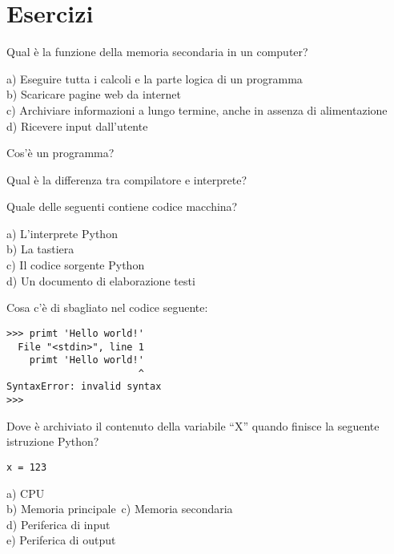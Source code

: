 \section{Esercizi}


\begin{ex}
Qual \`{e} la funzione della memoria secondaria in un computer?

a) Eseguire tutta i calcoli e la parte logica di un programma\\
b) Scaricare pagine web da internet\\
c) Archiviare informazioni a lungo termine, anche in assenza di alimentazione\\
d) Ricevere input dall'utente 
\end{ex}

\begin{ex}
Cos'\`{e} un programma?
\end{ex}

\begin{ex}
Qual \`{e} la differenza tra compilatore e interprete?
\end{ex}

\begin{ex}
Quale delle seguenti contiene codice macchina?

a) L'interprete Python\\
b) La tastiera\\
c) Il codice sorgente Python\\
d) Un documento di elaborazione testi
\end{ex}

\begin{ex}
Cosa c'\`{e} di sbagliato nel codice seguente:

\beforeverb
\begin{verbatim}
>>> primt 'Hello world!'
  File "<stdin>", line 1
    primt 'Hello world!'
                       ^
SyntaxError: invalid syntax
>>> 
\end{verbatim}
\afterverb

\end{ex}

\begin{ex}
Dove \`{e} archiviato il contenuto della variabile {``}X'' quando finisce la seguente istruzione Python?
\beforeverb
\begin{verbatim}
x = 123
\end{verbatim}
\afterverb
%
a) CPU\\
b) Memoria principale\
c) Memoria secondaria\\
d) Periferica di input\\
e) Periferica di output

\end{ex}

